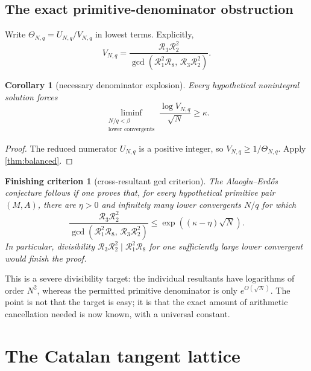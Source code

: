 \documentclass[11pt]{article}
\newtheorem{corollary}[theorem]{Corollary}
\newtheorem{criterion}[theorem]{Finishing criterion}
\theoremstyle{definition}
\theoremstyle{remark}
\begin{document}
\subsection{The exact primitive-denominator obstruction}
Write \(\Theta_{N,q}=U_{N,q}/V_{N,q}\) in lowest terms.  Explicitly,
\begin{equation}\label{eq:reduced-denom}
V_{N,q}
=\frac{\mathscr R_3\mathscr R_2^2}
{\gcd(\mathscr R_1^2\mathscr R_8,\,\mathscr R_3\mathscr R_2^2)}.
\end{equation}

\begin{corollary}[necessary denominator explosion]\label{cor:denominator}
Every hypothetical nonintegral solution forces
\begin{equation}\label{eq:denom-liminf}
\liminf_{\substack{N/q<\beta\\\text{lower convergents}}}
\frac{\log V_{N,q}}{\sqrt N}\ge\kappa.
\end{equation}
\end{corollary}

\begin{proof}
The reduced numerator \(U_{N,q}\) is a positive integer, so
\(V_{N,q}\ge1/\Theta_{N,q}\).  Apply \cref{thm:balanced}.
\end{proof}

\begin{criterion}[cross-resultant gcd criterion]\label{crit:gcd}
The Alaoglu--Erd\H{o}s conjecture follows if one proves that, for every hypothetical primitive pair \((M,A)\), there are \(\eta>0\) and infinitely many lower convergents \(N/q\) for which
\begin{equation}\label{eq:gcd-criterion}
\frac{\mathscr R_3\mathscr R_2^2}
{\gcd(\mathscr R_1^2\mathscr R_8,\,\mathscr R_3\mathscr R_2^2)}
\le \exp((\kappa-\eta)\sqrt N).
\end{equation}
In particular, divisibility
\(\mathscr R_3\mathscr R_2^2\mid\mathscr R_1^2\mathscr R_8\)
for one sufficiently large lower convergent would finish the proof.
\end{criterion}

This is a severe divisibility target: the individual resultants have logarithms of order \(N^2\), whereas the permitted primitive denominator is only \(e^{O(\sqrt N)}\).  The point is not that the target is easy; it is that the exact amount of arithmetic cancellation needed is now known, with a universal constant.

\section{The Catalan tangent lattice}\label{sec:tangent}
\end{document}
